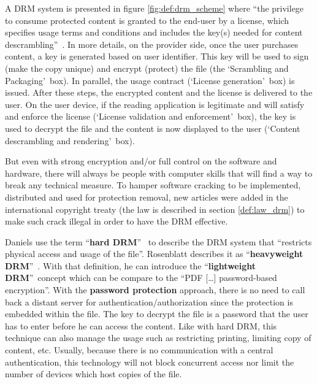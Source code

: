 \documentclass[11pt,a4paper,oneside]{memoir}
\begin{document}
A DRM system is presented in figure \ref{fig:def:drm_scheme} where \textquotedblleft the privilege to consume protected content is granted to the end-user by a license, which specifies usage terms and conditions and includes the key(s) needed for content descrambling\textquotedblright ~\cite{indicare:tiramisu}. In more details, on the provider side, once the user purchases content, a key is generated based on user identifier. This key will be used to sign (make the copy unique) and encrypt (protect) the file (the \textquoteleft Scrambling and Packaging\textquoteright ~box). In parallel, the usage contract (\textquoteleft License generation\textquoteright ~box) is issued. After these steps, the encrypted content and the license is delivered to the user. On the user device, if the reading application is legitimate and will satisfy and enforce the license (\textquoteleft License validation and enforcement\textquoteright ~box), the key is used to decrypt the file and the content is now displayed to the user (\textquoteleft Content descrambling and rendering\textquoteright ~box).


But even with strong encryption and/or full control on the software and hardware, there will always be people with computer skills that will find a way to break any technical measure.\label{def:law_intro} To hamper software cracking to be implemented, distributed and used for protection removal, new articles were added in the international copyright treaty (the law is described in section \ref{def:law_drm}) to make such crack illegal in order to have the DRM effective.

Daniels use the term \textquotedblleft \textbf{hard DRM}\textquotedblright ~\cite{dan:hard-soft-drm-1} to describe the DRM system that \textquotedblleft restricts physical access and usage of the file\textquotedblright. Rosenblatt describes it as \textquotedblleft \textbf{heavyweight DRM}\textquotedblright ~\cite{idpf:lcp-uc}. With that definition, he can introduce the \textquotedblleft \textbf{lightweight DRM}\textquotedblright ~concept which can be compare to the \textquotedblleft PDF [\ldots] password-based encryption\textquotedblright . With the \textbf{password protection} approach, there is no need to call back a distant server for authentication/authorization since the protection is embedded within the file. The key to decrypt the file is a password that the user has to enter before he can access the content. Like with hard DRM, this technique can also manage the usage such as restricting printing, limiting copy of content, etc. Usually, because there is no communication with a central authentication, this technology will not block concurrent access nor limit the number of devices which host copies of the file. \label{def:password_protection}
\end{document}
